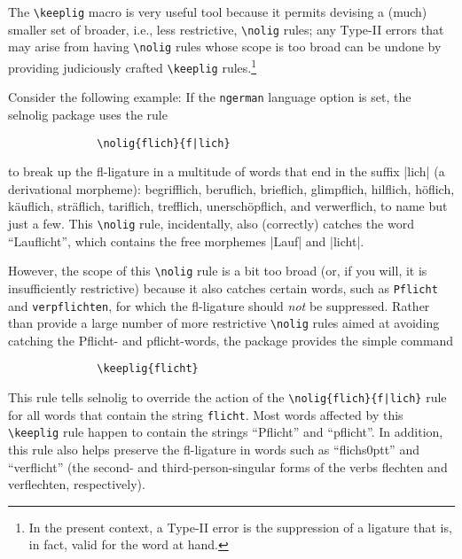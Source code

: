 \documentclass[11pt]{article}
\newcommand{\pkg}[1]{\textsf{#1}}
\newcommand{\opt}[1]{\texttt{#1}}
\newcommand{\cmmd}[1]{\texttt{\textbackslash #1}}
\begin{document}
The \cmmd{keeplig} macro is very useful tool because it permits devising a (much) smaller set of broader, i.e., less restrictive, \cmmd{nolig} rules; any Type-II errors that may arise from having \cmmd{nolig} rules whose scope is too broad can be undone by providing judiciously crafted \cmmd{keeplig} rules.\footnote{In the present context, a Type-II error is the suppression of a ligature that is, in fact, valid for the word at hand. }

Consider the following example: If the \opt{ngerman} language option is set, the \pkg{selnolig} package uses the rule 
\begin{Verbatim}
              \nolig{flich}{f|lich}
\end{Verbatim}
to break up the fl-ligature in a multitude of words that end in the suffix |lich| (a derivational morpheme): begrifflich, beruflich, brieflich, glimpflich, hilflich, höflich, käuflich, s\breaklig träflich, tariflich, trefflich, unerschöpflich, and verwerflich, to name but just a few. This \cmmd{nolig} rule, incidentally, also (correctly) catches the word \enquote{Lauflicht}, which contains the free morphemes |Lauf| and |licht|.

However, the scope of this \cmmd{nolig} rule is a bit too broad (or, if you will, it is insufficiently restrictive) because it also catches certain words, such as \opt{Pflicht} and \opt{verpflichten}, for which the fl-ligature should \emph{not} be suppressed. Rather than provide a large number of more restrictive \cmmd{nolig} rules aimed at avoiding catching the Pflicht- and pflicht-words, the package provides the simple command
\begin{Verbatim}
              \keeplig{flicht}
\end{Verbatim}
This rule tells \pkg{selnolig} to override the action of the \Verb+\nolig{flich}{f|lich}+ rule for all words that contain the string \opt{flicht}. Most words affected by this \cmmd{keeplig} rule happen to contain the strings \enquote{Pflicht} and \enquote{pflicht}. In addition, this rule also helps preserve the fl-ligature in words such as \enquote{flichs\kern0ptt} and \enquote{verflicht} (the second- and third-person-singular forms of the verbs flechten and verflechten, respectively).
\end{document}
